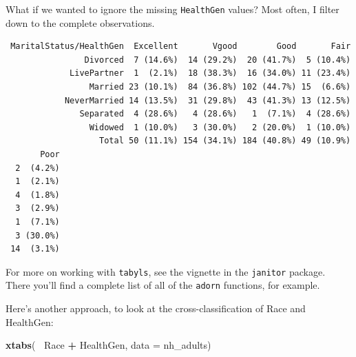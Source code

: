 \documentclass[
]{book}
\newenvironment{Shaded}{\begin{snugshade}}{\end{snugshade}}
\newcommand{\DataTypeTok}[1]{\textcolor[rgb]{0.13,0.29,0.53}{#1}}
\newcommand{\KeywordTok}[1]{\textcolor[rgb]{0.13,0.29,0.53}{\textbf{#1}}}
\newcommand{\NormalTok}[1]{#1}
\newcommand{\OperatorTok}[1]{\textcolor[rgb]{0.81,0.36,0.00}{\textbf{#1}}}
\newcommand{\StringTok}[1]{\textcolor[rgb]{0.31,0.60,0.02}{#1}}
\begin{document}
What if we wanted to ignore the missing \texttt{HealthGen} values? Most often, I filter down to the complete observations.

\begin{Shaded}
\end{Shaded}

\begin{verbatim}
 MaritalStatus/HealthGen  Excellent       Vgood        Good       Fair
                Divorced  7 (14.6%)  14 (29.2%)  20 (41.7%)  5 (10.4%)
             LivePartner  1  (2.1%)  18 (38.3%)  16 (34.0%) 11 (23.4%)
                 Married 23 (10.1%)  84 (36.8%) 102 (44.7%) 15  (6.6%)
            NeverMarried 14 (13.5%)  31 (29.8%)  43 (41.3%) 13 (12.5%)
               Separated  4 (28.6%)   4 (28.6%)   1  (7.1%)  4 (28.6%)
                 Widowed  1 (10.0%)   3 (30.0%)   2 (20.0%)  1 (10.0%)
                   Total 50 (11.1%) 154 (34.1%) 184 (40.8%) 49 (10.9%)
       Poor
  2  (4.2%)
  1  (2.1%)
  4  (1.8%)
  3  (2.9%)
  1  (7.1%)
  3 (30.0%)
 14  (3.1%)
\end{verbatim}

For more on working with \texttt{tabyls}, see the vignette in the \texttt{janitor} package. There you'll find a complete list of all of the \texttt{adorn} functions, for example.

Here's another approach, to look at the cross-classification of Race and HealthGen:

\begin{Shaded}
\begin{Highlighting}[]
\KeywordTok{xtabs}\NormalTok{(}\OperatorTok{~}\StringTok{ }\NormalTok{Race }\OperatorTok{+}\StringTok{ }\NormalTok{HealthGen, }\DataTypeTok{data =}\NormalTok{ nh_adults)}
\end{Highlighting}
\end{Shaded}
\end{document}
